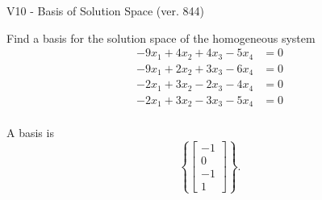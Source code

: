 \begin{exercise}
  \begin{exerciseTitle}V10 - Basis of Solution Space (ver. 844)\end{exerciseTitle}
  \begin{exerciseStatement}
    Find a basis for the solution space of the homogeneous system 
\begin{align*}
 -9 x_ 1 + 4 x_ 2 + 4 x_ 3 -5 x_ 4 &= 0  \\ 
  -9 x_ 1 + 2 x_ 2 + 3 x_ 3 -6 x_ 4 &= 0  \\ 
  -2 x_ 1 + 3 x_ 2 -2 x_ 3 -4 x_ 4 &= 0  \\ 
  -2 x_ 1 + 3 x_ 2 -3 x_ 3 -5 x_ 4 &= 0  \\ 
 \end{align*}


 
  \end{exerciseStatement}

  \begin{exerciseAnswer}
   A basis is   
\[\left\{\left[\begin{array}{c}
-1 \\
0 \\
-1 \\
1
\end{array}\right]\right\}.\]

  


  \end{exerciseAnswer}
\end{exercise}